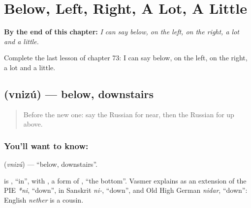 
\chapter{Below, Left, Right, A Lot, A Little}
\label{ch:ru-below-left-right-a-lot-a-little}

\begin{chapteropening}
\textbf{By the end of this chapter:} \emph{I can say below, on the left, on the right, a lot and a little.}

Complete the last lesson of chapter 73: I can say below, on the left, on the right, a lot and a little.
\end{chapteropening}

\section[\texorpdfstring{\ru{внизу} (vnizú)}{внизу (vnizú)}]{ (vnizú) — below, downstairs}

\label{lesson:RU-C73-below}



\begin{quote}
Before the new one: say the Russian for near, then the Russian for up above.
\end{quote}

\subsection*{You'll want to know: }
\textbf{} (\emph{vnizú}) — \textquotedblleft{}below, downstairs\textquotedblright{}.

\begin{cousinweb}
\textbf{} is \emph{}, \textquotedblleft{}in\textquotedblright{}, with \emph{}, a form of \emph{}, \textquotedblleft{}the bottom\textquotedblright{}. Vasmer explains \emph{} as an extension of the PIE \emph{*ni}, \textquotedblleft{}down\textquotedblright{}, in Sanskrit \emph{ni-}, \textquotedblleft{}down\textquotedblright{}, and Old High German \emph{nidar}, \textquotedblleft{}down\textquotedblright{}: English \emph{nether} is a cousin.
\end{cousinweb}

